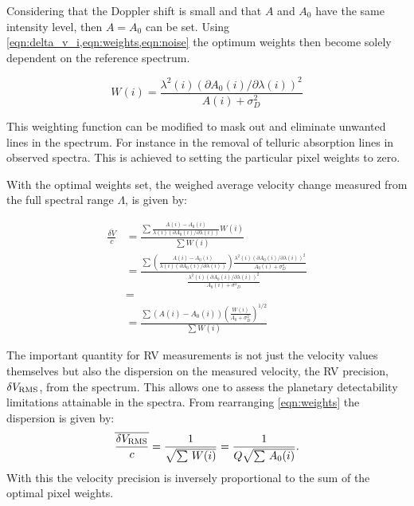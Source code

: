 Considering that the Doppler shift is small and that \(A\) and \(A_0\) have the same intensity level, then \(A = A_0\) can be set.
Using \cref{eqn:delta_v_i,eqn:weights,eqn:noise} the optimum weights then become solely dependent on the reference spectrum.

\begin{equation}
W(i) = \frac{{\lambda}^{2}(i) {({\partial A_0(i)}/{\partial \lambda(i)})}^{2}}{A(i) + {\sigma}^{2}_{D}} \label{eqn:optimal_weight}
\end{equation}

This weighting function can be modified to mask out and eliminate unwanted lines in the spectrum.
For instance in the removal of telluric absorption lines in observed spectra.
This is achieved to setting the particular pixel weights to zero.

With the optimal weights set, the weighed average velocity change measured from the full spectral range \(\Lambda\), is given by:

\begin{eqnarray}
    \frac{\overline{\delta V}}{c} &= \frac{
        \sum{
            \frac{
                A(i) - A_0(i)}{
                \lambda(i) \left({\partial A_0(i)}/{\partial \lambda(i)}\right)} W(i)}}{
             \sum{{W(i)}}} \\
    &= \frac{
        \sum {
            (\frac
                {A(i) - A_0(i)}
                {\lambda(i) (\partial A_0(i)/\partial \lambda(i))}) \frac
                    {{\lambda}^{2}(i) {({\partial A_0(i)}/{\partial \lambda(i)})}^{2}}
                    {A_{0}(i) + {\sigma}^{2}_{D}}
                 }
         }
    {\frac
        {{\lambda}^{2}(i) {({\partial A_0(i)}/{\partial \lambda(i)})}^{2}}{A_{0}(i) + {{\sigma}^{2}}_{D}}
        } \\
    &= \\
    &= \frac{\sum{(A(i) - A_0(i)){\left(\frac{W(i)}{A_0 +{\sigma}_{D}^{2}}\right)}^{1/2}}}{\sum{W(i)}}
    \label{eqn:delta_v_eqarray}
\end{eqnarray}

The important quantity for {RV} measurements is not just the velocity values themselves but also the dispersion on the measured velocity, the RV precision, \(\delta V_{\textrm{RMS}}\), from the spectrum.
This allows one to assess the planetary detectability limitations attainable in the spectra.
From rearranging \cref{eqn:weights} the dispersion is given by:
\begin{equation}
    \overline{\frac{\delta V_{\textrm{RMS}}}{c}} = \frac{1}{\sqrt{\sum{\,W(i)}}} = \frac{1}{Q \sqrt{\sum{\,A_0(i)}}}. \label{eqn:dv_rms}
\end{equation}
With this the velocity precision is inversely proportional to the sum of the optimal pixel weights.

